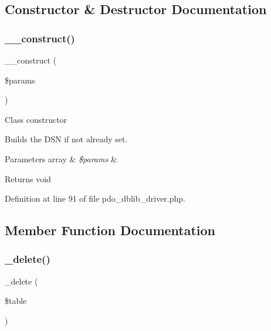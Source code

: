 \subsection{Constructor \& Destructor Documentation}
\mbox{\label{class_c_i___d_b__pdo__dblib__driver_a9162320adff1a1a4afd7f2372f753a3e}} 
\subsubsection{\texorpdfstring{\_\_construct()}{\_\_construct()}}
{\footnotesize\ttfamily \+\_\+\+\_\+construct (\begin{DoxyParamCaption}\item[{}]{\$params }\end{DoxyParamCaption})}

Class constructor

Builds the D\+SN if not already set.


\begin{DoxyParams}[1]{Parameters}
array & {\em \$params} & \\
\hline
\end{DoxyParams}
\begin{DoxyReturn}{Returns}
void 
\end{DoxyReturn}


Definition at line 91 of file pdo\+\_\+dblib\+\_\+driver.\+php.



\subsection{Member Function Documentation}
\mbox{\label{class_c_i___d_b__pdo__dblib__driver_a133ea8446ded52589bd22cc9163d0896}} 
\subsubsection{\texorpdfstring{\_delete()}{\_delete()}}
{\footnotesize\ttfamily \+\_\+delete (\begin{DoxyParamCaption}\item[{}]{\$table }\end{DoxyParamCaption})\hspace{0.3cm}{\ttfamily [protected]}}

